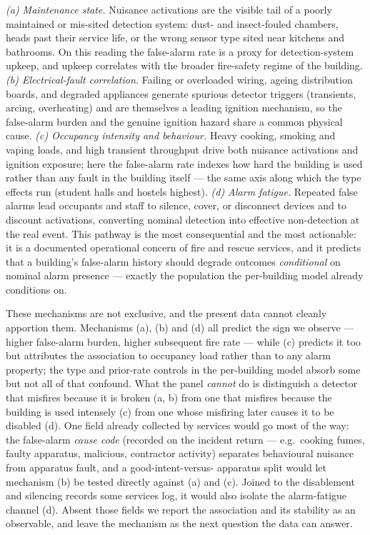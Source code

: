 \documentclass[11pt]{article}
\begin{document}
\emph{(a) Maintenance state.} Nuisance activations are the visible tail of a
poorly maintained or mis-sited detection system: dust- and insect-fouled
chambers, heads past their service life, or the wrong sensor type sited near
kitchens and bathrooms. On this reading the false-alarm rate is a proxy for
detection-system upkeep, and upkeep correlates with the broader fire-safety
regime of the building. \emph{(b) Electrical-fault correlation.} Failing or
overloaded wiring, ageing distribution boards, and degraded appliances generate
spurious detector triggers (transients, arcing, overheating) and are themselves
a leading ignition mechanism, so the false-alarm burden and the genuine
ignition hazard share a common physical cause. \emph{(c) Occupancy intensity and
behaviour.} Heavy cooking, smoking and vaping loads, and high transient
throughput drive both nuisance activations and ignition exposure; here the
false-alarm rate indexes how hard the building is used rather than any fault in
the building itself --- the same axis along which the type effects run
(student halls and hostels highest). \emph{(d) Alarm fatigue.} Repeated false
alarms lead occupants and staff to silence, cover, or disconnect devices and to
discount activations, converting nominal detection into effective non-detection
at the real event. This pathway is the most consequential and the most
actionable: it is a documented operational concern of fire and rescue services,
and it predicts that a building's false-alarm history should degrade outcomes
\emph{conditional} on nominal alarm presence --- exactly the population the
per-building model already conditions on.

These mechanisms are not exclusive, and the present data cannot cleanly
apportion them. Mechanisms (a), (b) and (d) all predict the sign we observe ---
higher false-alarm burden, higher subsequent fire rate --- while (c) predicts it
too but attributes the association to occupancy load rather than to any alarm
property; the type and prior-rate controls in the per-building model absorb some
but not all of that confound. What the panel \emph{cannot} do is distinguish a
detector that misfires because it is broken (a, b) from one that misfires
because the building is used intensely (c) from one whose misfiring later causes
it to be disabled (d). One field already collected by services would go most of
the way: the false-alarm \emph{cause code} (recorded on the incident return ---
e.g.\ cooking fumes, faulty apparatus, malicious, contractor activity)
separates behavioural nuisance from apparatus fault, and a good-intent-versus-
apparatus split would let mechanism (b) be tested directly against (a) and (c).
Joined to the disablement and silencing records some services log, it would also
isolate the alarm-fatigue channel (d). Absent those fields we report the
association and its stability as an observable, and leave the mechanism as the
next question the data can answer.
\end{document}
